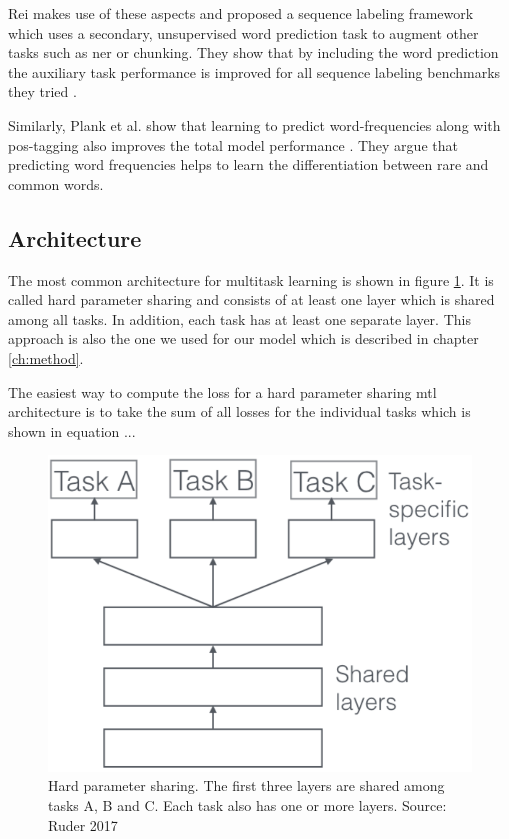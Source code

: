 Rei makes use of these aspects and proposed a sequence labeling framework which uses a secondary, unsupervised word prediction task to augment other tasks such as \gls{ner} or chunking. They show that by including the word prediction the auxiliary task performance is improved for all sequence labeling benchmarks they tried \cite{Rei2017}.

Similarly, Plank et al. show that learning to predict word-frequencies along with \gls{pos}-tagging also improves the total model performance \cite{Plank}. They argue that predicting word frequencies helps to learn the differentiation between rare and common words.


\subsection{Architecture}
The most common architecture for multitask learning is shown in figure \ref{fig:03_mtl_architecture}. It is called hard parameter sharing and consists of at least one layer which is shared among all tasks. In addition, each task has at least one separate layer. This approach is also the one we used for our model which is described in chapter \ref{ch:method}. 

The easiest way to compute the loss for a hard parameter sharing \gls{mtl} architecture is to take the sum of all losses for the individual tasks which is shown in equation ...


\begin{figure}[ht]
	\centering
	\includegraphics[scale=0.5]{figures/03_theory/03_mtl_architecture}
	\caption{Hard parameter sharing. The first three layers are shared among tasks A, B and C. Each task also has one or more layers. Source: Ruder 2017 \cite{Ruder2017}}
	\label{fig:03_mtl_architecture}
\end{figure}



